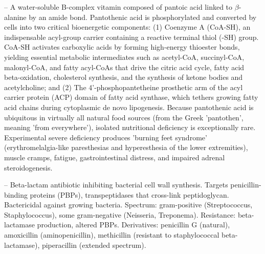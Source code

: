 -- A water-soluble B-complex vitamin composed of pantoic acid linked to $\beta$-alanine by an amide bond. Pantothenic acid is phosphorylated and converted by cells into two critical bioenergetic components: (1) Coenzyme A (CoA-SH), an indispensable acyl-group carrier containing a reactive terminal thiol (-SH) group. CoA-SH activates carboxylic acids by forming high-energy thioester bonds, yielding essential metabolic intermediates such as acetyl-CoA, succinyl-CoA, malonyl-CoA, and fatty acyl-CoAs that drive the citric acid cycle, fatty acid beta-oxidation, cholesterol synthesis, and the synthesis of ketone bodies and acetylcholine; and (2) The 4'-phosphopantetheine prosthetic arm of the acyl carrier protein (ACP) domain of fatty acid synthase, which tethers growing fatty acid chains during cytoplasmic de novo lipogenesis. Because pantothenic acid is ubiquitous in virtually all natural food sources (from the Greek 'pantothen', meaning 'from everywhere'), isolated nutritional deficiency is exceptionally rare. Experimental severe deficiency produces 'burning feet syndrome' (erythromelalgia-like paresthesias and hyperesthesia of the lower extremities), muscle cramps, fatigue, gastrointestinal distress, and impaired adrenal steroidogenesis.

-- Beta-lactam antibiotic inhibiting bacterial cell wall synthesis. Targets penicillin-binding proteins (PBPs), transpeptidases that cross-link peptidoglycan. Bactericidal against growing bacteria. Spectrum: gram-positive (Streptococcus, Staphylococcus), some gram-negative (Neisseria, Treponema). Resistance: beta-lactamase production, altered PBPs. Derivatives: penicillin G (natural), amoxicillin (aminopenicillin), methicillin (resistant to staphylococcal beta-lactamase), piperacillin (extended spectrum).

